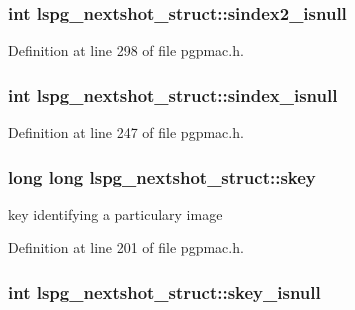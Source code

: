 \hypertarget{structlspg__nextshot__struct_a28e0b5c32a2741ef22edeb9d35b04e4d}{
\subsubsection[{sindex2\-\_\-isnull}]{\setlength{\rightskip}{0pt plus 5cm}int lspg\-\_\-nextshot\-\_\-struct\-::sindex2\-\_\-isnull}}\label{structlspg__nextshot__struct_a28e0b5c32a2741ef22edeb9d35b04e4d}


Definition at line 298 of file pgpmac.\-h.

\hypertarget{structlspg__nextshot__struct_a7ca4fbc86974d1b75a681ba5ecaaf5af}{
\subsubsection[{sindex\-\_\-isnull}]{\setlength{\rightskip}{0pt plus 5cm}int lspg\-\_\-nextshot\-\_\-struct\-::sindex\-\_\-isnull}}\label{structlspg__nextshot__struct_a7ca4fbc86974d1b75a681ba5ecaaf5af}


Definition at line 247 of file pgpmac.\-h.

\hypertarget{structlspg__nextshot__struct_af64a4e3f17752b5f1f05fb15d6f48382}{
\subsubsection[{skey}]{\setlength{\rightskip}{0pt plus 5cm}long long lspg\-\_\-nextshot\-\_\-struct\-::skey}}\label{structlspg__nextshot__struct_af64a4e3f17752b5f1f05fb15d6f48382}


key identifying a particulary image 



Definition at line 201 of file pgpmac.\-h.

\hypertarget{structlspg__nextshot__struct_abd3c69357470052eb79ddd8eddd57b2c}{
\subsubsection[{skey\-\_\-isnull}]{\setlength{\rightskip}{0pt plus 5cm}int lspg\-\_\-nextshot\-\_\-struct\-::skey\-\_\-isnull}}\label{structlspg__nextshot__struct_abd3c69357470052eb79ddd8eddd57b2c}


